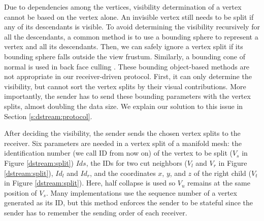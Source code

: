     Due to dependencies among the vertices, visibility determination of a vertex cannot be based 
	on the vertex alone.
    An invisible vertex still needs to be split if any of its descendants is visible. 
    To avoid determining the visibility %
    recursively for all the descendants,
    a common method is to use a bounding sphere to represent a vertex and all its descendants.
    Then, we can safely ignore a vertex split if its bounding sphere
    falls outside the view frustum.
    Similarly, a bounding cone of normal is used in back face culling \cite{258843}.
    These bounding object-based methods are not appropriate
    in our receiver-driven protocol. First, it can only determine
    the visibility, but cannot sort the vertex splits by their visual contributions. 
    More importantly, the sender has to send
    these bounding parameters with the vertex splits, almost doubling 
    the data size.  We explain our solution to this issue in Section \ref{s:dstream:protocol}.

    After deciding the visibility, the sender sends the chosen vertex splits to the receiver.
    Six parameters are needed in a vertex split of a manifold mesh: the identification number
    (we call ID from now on) of the vertex to be split
    ($V_s$ in Figure \ref{dstream:split}) $Ids$, 
    the IDs for two cut neighbors 
    ($V_l$ and $V_r$ in Figure \ref{dstream:split}), $Id_l$ and $Id_r$,
    and the coordinates $x$, $y$, and $z$ of the right child ($V_t$ in
    Figure \ref{dstream:split}). Here, half collapse is used so $V_u$ remains at the same position
    of $V_s$. Many implementations use the sequence number of a vertex generated as its ID,
    but this method enforces the sender to be stateful since the sender has to remember 
    the sending order of each receiver.
    
